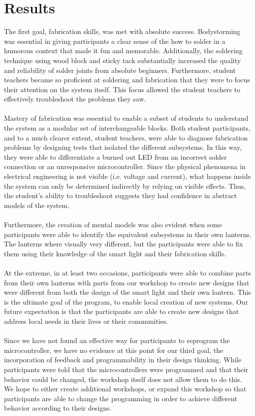 \documentclass[11pt, twocolumn]{article}
\begin{document}
\section*{Results}
The first goal, fabrication skills, was met with absolute success. Bodystorming was essential in giving participants a clear sense of the how to solder in a humorous context that made it fun and memorable. Additionally, the soldering technique using wood block and sticky tack substantially increased the quality and reliability of solder joints from absolute beginners. Furthermore, student teachers became so proficient at soldering and fabrication that they were to focus their attention on the system itself. This focus allowed the student teachers to effectively troubleshoot the problems they saw.\ \\
\ \\
Mastery of fabrication was essential to enable a subset of students to understand the system as a modular set of interchangeable blocks. Both student participants, and to a much clearer extent, student teachers, were able to diagnose fabrication problems by designing tests that isolated the different subsystems. In this way, they were able to differentiate a burned out LED from an incorrect solder connection or an unresponsive microcontroller. Since the physical phenomena in electrical engineering is not visible (i.e. voltage and current), what happens inside the system can only be determined indirectly by relying on visible effects. Thus, the student’s ability to troubleshoot suggests they had confidence in abstract models of the system.\ \\
\ \\
Furthermore, the creation of mental models was also evident when some participants were able to identify the equivalent subsystems in their own lanterns. The lanterns where visually very different, but the participants were able to fix them using their knowledge of the smart light and their fabrication skills.\ \\
\ \\
At the extreme, in at least two occasions, participants were able to combine parts from their own lanterns with parts from our workshop to create new designs that were different from both the design of the smart light and their own lantern. This is the ultimate goal of the program, to enable local creation of new systems. Our future expectation is that the participants are able to create new designs that address local needs in their lives or their communities.\ \\
\ \\
Since we have not found an effective way for participants to reprogram the microcontroller, we have no evidence at this point for our third goal, the incorporation of feedback and programmability in their design thinking. While participants were told that the microcontrollers were programmed and that their behavior could be changed, the workshop itself does not allow them to do this. We hope to either create additional workshops, or expand this workshop so that participants are able to change the programming in order to achieve different behavior according to their designs.
\end{document}
